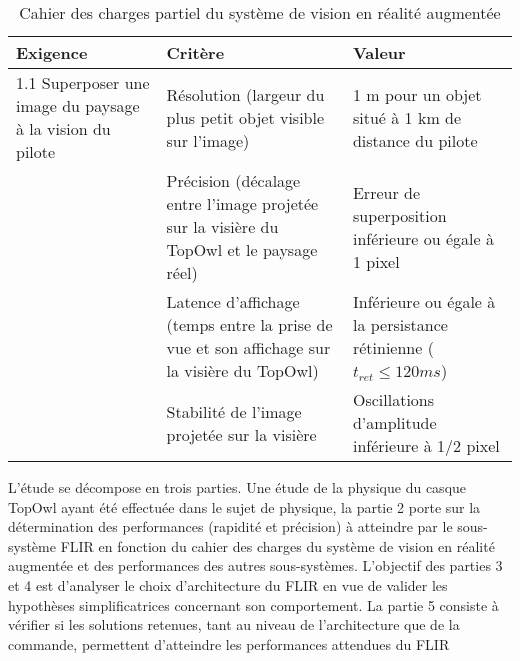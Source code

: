 \begin{table}[!htb]
\begin{center}
\begin{tabular}{|p{}|p{}|p{}|}
\hline 
\textbf{Exigence} & \textbf{Critère} & \textbf{Valeur} \\ 
\hline 
1.1 Superposer une image du paysage à la vision du pilote & Résolution (largeur du plus petit
objet visible sur l'image) & 1 m pour un objet situé à 1 km de
distance du pilote \\ 
\cline{2-3} 
& Précision (décalage entre l'image
projetée sur la visière du TopOwl et
le paysage réel) & Erreur de superposition inférieure
ou égale à 1 pixel\\ 
\cline{2-3}  
 & Latence d'affichage (temps entre la
prise de vue et son affichage sur la
visière du TopOwl) & Inférieure ou égale à la persistance
rétinienne ($t_{ret} \leq 120 ms$) \\ 
\cline{2-3}  
 & Stabilité de l'image projetée sur la
visière & Oscillations d'amplitude inférieure
à 1/2 pixel \\ 
\hline
\end{tabular} 
\caption{Cahier des charges partiel du système de vision en réalité augmentée \label{tab1}}
\end{center}
\end{table}

L'étude se décompose en trois parties. Une étude de la physique du casque TopOwl ayant été effectuée dans
le sujet de physique, la partie 2 porte sur la détermination des performances (rapidité et précision) à atteindre
par le sous-système FLIR en fonction du cahier des charges du système de vision en réalité augmentée et
des performances des autres sous-systèmes. L'objectif des parties 3 et 4 est d'analyser le choix d'architecture du
FLIR en vue de valider les hypothèses simplificatrices concernant son comportement. La partie 5 consiste à
vérifier si les solutions retenues, tant au niveau de l'architecture que de la commande, permettent d'atteindre
les performances attendues du FLIR
